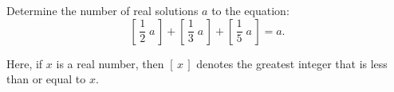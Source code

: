 Determine the number of real solutions $a$ to the equation:\[ \left[\,\frac{1}{2}\;a\,\right]+\left[\,\frac{1}{3}\;a\,\right]+\left[\,\frac{1}{5}\;a\,\right] = a. \]

Here, if $x$ is a real number, then $[\,x\,]$ denotes the greatest integer that is less than or equal to $x$.
